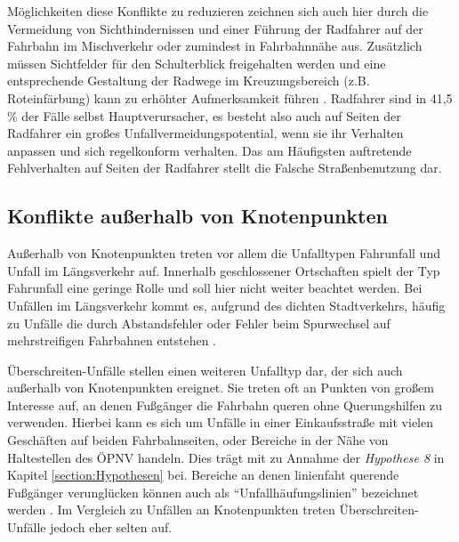 Möglichkeiten diese Konflikte zu reduzieren zeichnen sich auch hier durch die Vermeidung von Sichthindernissen und einer Führung der Radfahrer auf der Fahrbahn im Mischverkehr oder zumindest in Fahrbahnnähe aus. Zusätzlich müssen Sichtfelder für den Schulterblick freigehalten werden und eine entsprechende Gestaltung der Radwege im Kreuzungsbereich (z.B. Roteinfärbung) kann zu erhöhter Aufmerksamkeit führen \parencite[S. 309]{Schreiber.2014b}. Radfahrer sind in 41,5 \% \parencite[S. 10]{Below.2016} der Fälle selbst Hauptverursacher, es besteht also auch auf Seiten der Radfahrer ein großes Unfallvermeidungspotential, wenn sie ihr Verhalten anpassen und sich regelkonform verhalten. Das am Häufigsten auftretende Fehlverhalten auf Seiten der Radfahrer stellt die Falsche Straßenbenutzung dar.

\subsection{Konflikte außerhalb von Knotenpunkten}
Außerhalb von Knotenpunkten treten vor allem die Unfalltypen Fahrunfall und Unfall im Längsverkehr auf. Innerhalb geschlossener Ortschaften spielt der Typ Fahrunfall eine geringe Rolle und soll hier nicht weiter beachtet werden. Bei Unfällen im Längsverkehr kommt es, aufgrund des dichten Stadtverkehrs, häufig zu Unfälle die durch Abstandsfehler oder Fehler beim Spurwechsel auf mehrstreifigen Fahrbahnen entstehen \parencite[S. 25]{Schmidt.2010}.

Überschreiten-Unfälle stellen einen weiteren Unfalltyp dar, der sich auch außerhalb von Knotenpunkten ereignet. Sie treten oft an Punkten von großem Interesse auf, an denen Fußgänger die Fahrbahn queren ohne Querungshilfen zu verwenden. Hierbei kann es sich um Unfälle in einer Einkaufsstraße mit vielen Geschäften auf beiden Fahrbahnseiten, oder Bereiche in der Nähe von Haltestellen des \ac{ÖPNV} handeln. Dies trägt mit zu Annahme der \textit{Hypothese 8} in Kapitel \ref{section:Hypothesen} bei. Bereiche an denen linienfaht querende Fußgänger verunglücken können auch als \enquote{Unfallhäufungslinien} bezeichnet werden \parencite[S. 18]{ForschungsgesellschaftfurStraenundVerkehrswesen.2012}. Im Vergleich zu Unfällen an Knotenpunkten treten Überschreiten-Unfälle jedoch eher selten auf.

